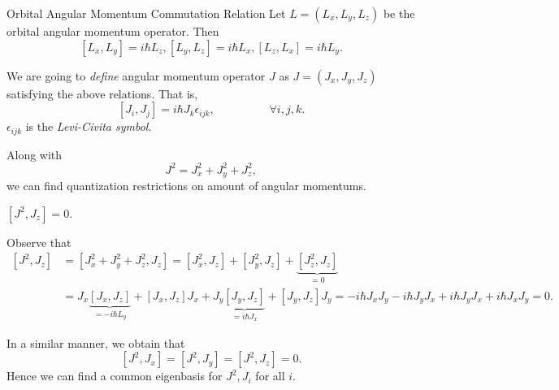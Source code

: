 \documentclass[phys334]{subfiles}
\begin{document}
    \begin{summary}{Orbital Angular Momentum Commutation Relation}
        Let $L = \left( L_x,L_y,L_z \right)$ be the orbital angular momentum operator. Then
        \begin{equation*}
            \left[ L_x,L_y \right] = i\hbar L_z, \left[ L_y,L_z \right] = i\hbar L_x, \left[ L_z,L_x \right] = i\hbar L_y.
        \end{equation*}
    \end{summary}

    \np We are going to \textit{define} angular momentum operator $J$ as $J = \left( J_x,J_y,J_z \right)$ satisfying the above relations. That is,
    \begin{equation*}
        \left[ J_i,J_j \right] = i\hbar J_k \epsilon_{ijk}, \hspace{2cm}\forall i,j,k.
    \end{equation*}
    $\epsilon_{ijk}$ is the \textit{Levi-Civita symbol}.

    Along with
    \begin{equation*}
        J^{2} = J_x^{2}+J_y^{2}+J_z^{2},
    \end{equation*}
    we can find quantization restrictions on amount of angular momentums.
    
    \begin{claim}
        $\left[ J^{2},J_z \right] = 0$.

        Observe that
        \begin{equation*}
            \begin{aligned}
                \left[ J^{2},J_z \right] & = \left[ J_x^{2}+J_y^{2}+J_z^{2},J_z \right] = \left[ J_x^{2},J_z \right] + \left[ J_y^{2},J_z \right] + \underbrace{\left[ J_z^{2},J_z \right]}_{=0} \\
                                         & = J_x\underbrace{\left[ J_x,J_z \right]}_{=-i\hbar L_y} + \left[ J_x,J_z \right]J_x + J_y\underbrace{\left[ J_y,J_z \right]}_{=i\hbar J_x} + \left[ J_y,J_z \right]J_y= -i\hbar J_xJ_y - i\hbar J_yJ_x + i\hbar J_yJ_x + i\hbar J_xJ_y = 0.
            \end{aligned} 
        \end{equation*}
    \end{claim}

    \np In a similar manner, we obtain that
    \begin{equation*}
        \left[ J^{2},J_x \right] = \left[ J^{2},J_y \right] = \left[ J^{2},J_z \right] = 0.
    \end{equation*}
    Hence we can find a common eigenbasis for $J^{2},J_i$ for all $i$.
\end{document}
